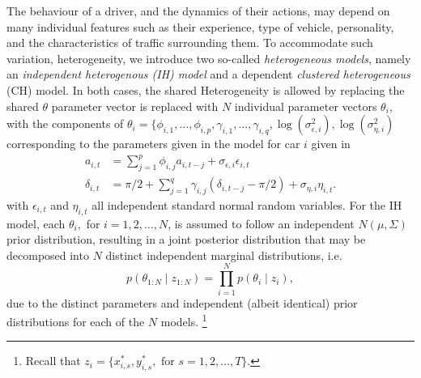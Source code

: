 \documentclass[12pt,a4paper]{article}\usepackage[]{graphicx}\usepackage[]{color}
\begin{document}
The behaviour of a driver, and the dynamics of their actions, may depend on many individual features such as their experience, type of vehicle, personality, and the characteristics of traffic surrounding them. To accommodate such variation, heterogeneity, we introduce two so-called \textit{heterogeneous models}, namely an \textit{independent heterogenous (IH) model} and a dependent \textit{clustered heterogeneous} (CH) model. In both cases, the shared Heterogeneity is allowed by replacing the shared $\theta$ parameter vector is replaced with $N$ individual parameter vectors $\theta_i$, with the components of $\theta_i=\{\phi_{i,1}, \dots, \phi_{i,p}, \gamma_{i,1}, \dots, \gamma_{i,q}, \log(\sigma^{2}_{\epsilon,i}), \log(\sigma^{2}_{\eta,i})$ corresponding to the parameters given in the model for car $i$ given in
\begin{align}
a_{i, t} &= \sum_{j = 1}^p \phi_{i, j} a_{i, t-j} + \sigma_{\epsilon, i} \epsilon_{i, t} \label{aAR2} \\
\delta_{i, t} &= \pi/2 + \sum_{j = 1}^q \gamma_{i, j} (\delta_{i, t-j} - \pi/2) + \sigma_{\eta, i} \eta_{i, t}. \label{dAR2}
\end{align}
with $\epsilon_{i,t}$ and $\eta_{i,t}$ all independent standard normal random variables. For the IH model, each $\theta_i,$ for $i=1,2,\ldots, N$, is assumed to follow an independent $N(\mu, \Sigma)$ prior distribution, resulting in a joint posterior distribution that may be decomposed into $N$ distinct independent marginal distributions, i.e.
\begin{equation}
p(\theta_{1:N} \mid z_{1:N}) = \prod_{i=1}^N p(\theta_{i} \mid z_{i}),
\end{equation}
due to the distinct parameters and independent (albeit identical) prior distributions for each of the $N$ models. \footnote{Recall that $z_{i}=\{x^*_{i,s},y^*_{i,s},\mbox{ for } s=1,2,...,T \}$.}
\\
\end{document}
